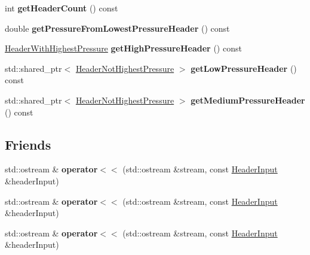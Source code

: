 \begin{DoxyCompactItemize}
\item 
\mbox{\label{class_header_input_a45e461a0eca1df691fe13f6f9b1968fe}} 
int {\bfseries get\+Header\+Count} () const
\item 
\mbox{\label{class_header_input_a820d9ed7adc49098eeca8af3694f91ee}} 
double {\bfseries get\+Pressure\+From\+Lowest\+Pressure\+Header} () const
\item 
\mbox{\label{class_header_input_a298d0336874b64566c6abdc05639df20}} 
\hyperlink{class_header_with_highest_pressure}{Header\+With\+Highest\+Pressure} {\bfseries get\+High\+Pressure\+Header} () const
\item 
\mbox{\label{class_header_input_a3e23a733f6dfd723db64a37ef2d62a23}} 
std\+::shared\+\_\+ptr$<$ \hyperlink{class_header_not_highest_pressure}{Header\+Not\+Highest\+Pressure} $>$ {\bfseries get\+Low\+Pressure\+Header} () const
\item 
\mbox{\label{class_header_input_ae2bc38a82e48be3bc61732b152e47c68}} 
std\+::shared\+\_\+ptr$<$ \hyperlink{class_header_not_highest_pressure}{Header\+Not\+Highest\+Pressure} $>$ {\bfseries get\+Medium\+Pressure\+Header} () const
\end{DoxyCompactItemize}
\subsection*{Friends}
\begin{DoxyCompactItemize}
\item 
\mbox{\label{class_header_input_a2ce65506875f1518862602a22788a44f}} 
std\+::ostream \& {\bfseries operator$<$$<$} (std\+::ostream \&stream, const \hyperlink{class_header_input}{Header\+Input} \&header\+Input)
\item 
\mbox{\label{class_header_input_a2ce65506875f1518862602a22788a44f}} 
std\+::ostream \& {\bfseries operator$<$$<$} (std\+::ostream \&stream, const \hyperlink{class_header_input}{Header\+Input} \&header\+Input)
\item 
\mbox{\label{class_header_input_a2ce65506875f1518862602a22788a44f}} 
std\+::ostream \& {\bfseries operator$<$$<$} (std\+::ostream \&stream, const \hyperlink{class_header_input}{Header\+Input} \&header\+Input)
\end{DoxyCompactItemize}


